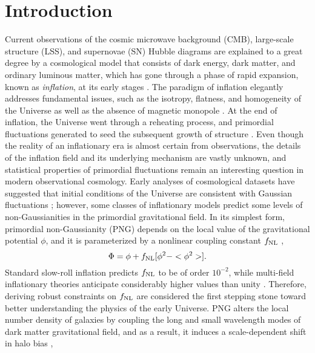 \section{Introduction}
\label{sec:introduction}
Current observations of the cosmic microwave background (CMB), large-scale structure (LSS), and supernovae (SN) Hubble diagrams are explained to a great degree by a cosmological model that consists of dark energy, dark matter, and ordinary luminous matter, which has gone through a phase of rapid expansion, known as \textit{inflation}, at its early stages \citep[see, e.g.,][]{weinberg2013observational}. The paradigm of inflation elegantly addresses fundamental issues, such as the isotropy, flatness, and homogeneity of the Universe as well as the absence of magnetic monopole \citep[see, e.g.,][]{weinberg2008cosmology}. At the end of inflation, the Universe went through a reheating process, and primordial fluctuations generated to seed the subsequent growth of structure \citep{kofman1994reheating, bassett2006inflation, lyth2009primordial}. Even though the reality of an inflationary era is almost certain from observations, the details of the inflation field and its underlying mechanism are vastly unknown, and statistical properties of primordial fluctuations remain an interesting question in modern observational cosmology. Early analyses of cosmological datasets have suggested that initial conditions of the Universe are consistent with Gaussian fluctuations \citep{guth2005inflationary}; however, some classes of inflationary models predict some levels of non-Gaussianities in the primordial gravitational field. In its simplest form, primordial non-Gaussianity (PNG) depends on the local value of the gravitational potential $\phi$, and it is parameterized by a nonlinear coupling constant $f_{\rm NL}$ \citep{komatsu2001acoustic},
\begin{equation}
 \Phi = \phi + f_{\rm NL} [\phi^{2} - <\phi^{2}>].
\end{equation}
Standard slow-roll inflation predicts $f_{\rm NL}$ to be of order $10^{-2}$, while multi-field inflationary theories anticipate considerably higher values than unity \citep[see, e.g.,][]{de2017next}. Therefore, deriving robust constraints on $f_{\rm NL}$ are considered the first stepping stone toward better understanding the physics of the early Universe. PNG alters the local number density of galaxies by coupling the long and small wavelength modes of dark matter gravitational field, and as a result, it induces a scale-dependent shift in halo bias \citep[see, e.g.,][]{dalal2008imprints, slosar2008constraints},
